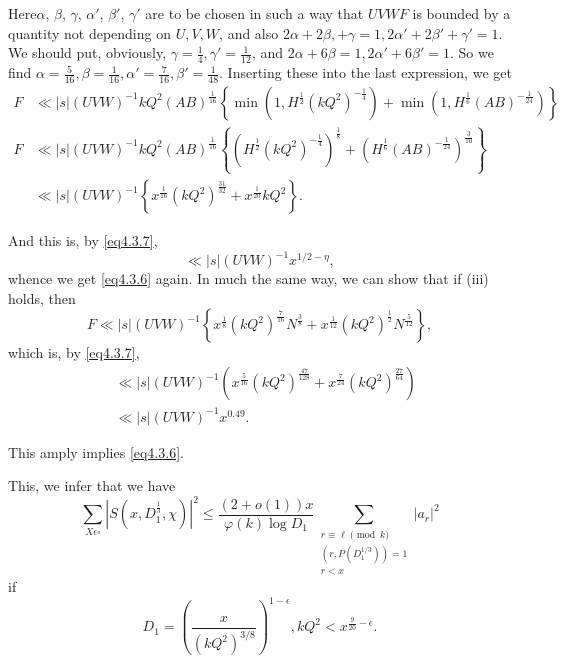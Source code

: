 Here\pageoriginale $\alpha$, $\beta$, $\gamma$, ${\alpha'}$,
${\beta'}$, ${\gamma'}$ are to be 
chosen in such a way that $UVWF$ is bounded by a quantity not
depending on $U,V,W$, and also $2\alpha + 2\beta,+\gamma =
1,{2\alpha'} + {2 \beta'} + {\gamma'} = 1$. We should put, obviously,
$\gamma =\frac{1}{4}, {\gamma'} = \frac{1}{12}$, and $2 \alpha + 6
\beta = 1, {2 \alpha'} + {6 \beta'} = 1$. So we find $\alpha=
\frac{5}{16}, \beta= \frac{1}{16}, {\alpha'}= \frac{7}{16}, {\beta'}=
\frac{1}{48}$. Inserting these into the last expression, we get 
{\fontsize{10pt}{12pt}\selectfont
\begin{align*}
  F & \ll |s|(UVW)^{-1} kQ^2 (AB)^{\frac{1}{16}} \left\{ \min
  (1,H^{\frac{1}{2}} (kQ^2)^{-\frac{1}{4}}) + \min
  (1,H^{\frac{1}{6}}(AB)^{-\frac{1}{24}})\right\}\\ 
  F & \ll |s|(UVW)^{-1} kQ^2 (AB)^{\frac{1}{16}} \left\{ \left(H^{\frac{1}{2}}
  (kQ^2)^{-\frac{1}{4}}\right)^{\frac{1}{8}} +
  \left(H^{\frac{1}{6}}(AB)^{-\frac{1}{24}}\right)^{\frac{3}{10}}\right\}\\ 
 & \ll |s| (UVW)^{-1} \left\{ x ^{\frac{1}{16}}(kQ^2)^{\frac{31}{32}} +
  x^{\frac{1}{20}} kQ^2 \right\}. 
\end{align*}}\relax

And this is, by \eqref{eq4.3.7},
$$
\ll |s|(UVW) ^{-1} x^{1/2-\eta},
$$
whence we get \eqref{eq4.3.6} again. In much the same way,  we can
show that\pageoriginale 
if (iii) holds, then 
$$
F \ll |s| (UVW)^{-1} \left\{ x^{\frac{1}{8}}(kQ^2)^{\frac{7}{16}}
N^{\frac{3}{8}} +  x^{\frac{1}{12}} (kQ^2)^{\frac{1}{2}}
N^{\frac{5}{12}}\right\}, 
$$
which is, by \eqref{eq4.3.7},
\begin{align*}
  & \ll |s|(UVW)^{-1} \left(x^{\frac{5}{16}}(kQ^2)^{\frac{47}{128}} +
  x^{\frac{7}{24}}(kQ^2)^{\frac{27}{64}}\right)\\ 
  & \ll |s|(UVW)^{-1} x^{0.49}.
\end{align*}

This amply implies \eqref{eq4.3.6}.

This, we infer that we have
\begin{equation*}
\sum_{ X \epsilon  \square } |S (x,D_1^{\frac{1}{3}}, \chi)|^2 \le
  \frac{(2 + o(1))x}{\varphi(k)\log D_1} \sum_{\substack{r \equiv \ell
      \pmod{k} \\ (r,P(D_1^{1/3})) = 1 \\ r <x}} |a_r|^2
  \tag{4.3.8}\label{eq4.3.8} 
\end{equation*}
if
$$
  D_1 = \left(\frac{x}{(kQ^2)^{3/8}}\right)^{1-\epsilon }, kQ^2 <
  x^{\frac{9}{20}- \epsilon }.
$$

